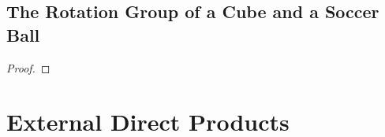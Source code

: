 \documentclass{article}
\newtheorem{theorem}{Theorem}[section]
\theoremstyle{definition}
\begin{document}
     \subsection{The Rotation Group of a Cube and a Soccer Ball}
     
     \begin{proof}
        
     \end{proof}
     
     \section{External Direct Products}
\end{document}
